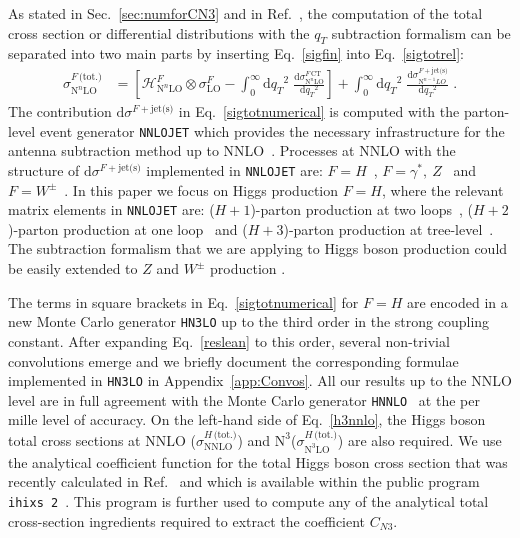 \documentclass[12pt]{article}
\DeclareRobustCommand{\qt}{\ensuremath{q_T}\xspace}
\DeclareRobustCommand{\rd}{\ensuremath{\mathrm{d}}}
\DeclareRobustCommand{\cH}{\ensuremath{\mathcal{H}}}
\DeclareRobustCommand{\jets}{\text{jet(s)}\xspace}
\DeclareRobustCommand{\CT}{\text{CT}\xspace}
\DeclareRobustCommand{\tot}{\text{(tot.)}\xspace}
\DeclareRobustCommand{\LO}{\text{LO}\xspace}
\DeclareRobustCommand{\NNLO}{\text{NNLO}\xspace}
\DeclareRobustCommand{\N}[1]{\ensuremath{\text{N}^{#1}}} %
\begin{document}
As stated in Sec.~\ref{sec:numforCN3} and in Ref.~\cite{Catani:2007vq}, the computation of the total cross section or differential distributions with the  $\qt$ subtraction formalism can be separated into two main parts by inserting Eq.~\eqref{sigfin} into Eq.~\eqref{sigtotrel}:
\begin{align}
  \sigma^{F\,\tot}_{\N{n}\LO}
  &=
  \left[
    \cH^F_{\N{n}\LO} \otimes \sigma^F_{\LO}
    - \int_0^\infty\rd\qt^2 \; \frac{\rd\sigma^{F\,\CT}_{\N{n}\LO}}{\rd\qt^2} 
  \right]
  + \int_0^\infty\rd\qt^2 \; \frac{\rd\sigma^{F+\jets}_{\N{n-1}LO}}{\rd\qt^2} \;.
  \label{sigtotnumerical} 
\end{align}
The contribution $\rd{\sigma}^{F+\jets}$ in Eq.~\eqref{sigtotnumerical} is computed with the parton-level event generator \texttt{NNLOJET} which provides the necessary infrastructure for the antenna subtraction method up to NNLO~\cite{Antenna:method}. 
Processes at NNLO with the structure of $\rd{\sigma}^{F+\jets}$ implemented in \texttt{NNLOJET} are: $F=H$~\cite{Chen:2016zka}, $F=\gamma^*,~Z$~\cite{Ridder:2015dxa,Gehrmann-DeRidder:2016jns} and $F=W^{\pm}$~\cite{Gehrmann-DeRidder:2017mvr}. In this paper we focus on Higgs production $F=H$, where the relevant matrix elements in 
 \texttt{NNLOJET} are: ($H+1$)-parton production at two loops~\cite{Gehrmann:2011aa}, ($H+2$)-parton production at one loop~\cite{Dixon:2009uk,Badger:2009hw,Badger:2009vh} and ($H+3$)-parton 
 production at tree-level~\cite{DelDuca:2004wt,Dixon:2004za,Badger:2004ty}. The subtraction formalism that we are applying to Higgs boson production could be easily extended  to $Z$ and $W^{\pm}$ production \cite{leaninprep}. 

The terms in square brackets in Eq.~\eqref{sigtotnumerical}  for $F=H$ are encoded in a new Monte Carlo generator \texttt{HN3LO} \cite{leaninprepHN3LO} up to the third order in the strong coupling constant. After expanding Eq.~\eqref{reslean} to this order, several non-trivial convolutions emerge and we briefly document the corresponding formulae implemented in \texttt{HN3LO} in Appendix~\ref{app:Convos}. All our results up to the NNLO level are in full agreement with the Monte Carlo generator \texttt{HNNLO}~\cite{Catani:2007vq} at the per mille level of accuracy. On the left-hand side of Eq.~\eqref{h3nnlo}, the Higgs boson total cross sections at NNLO ($\sigma^{H\,\tot}_{\NNLO}$) and \N3\LO  ($\sigma^{H\,\tot}_{\N{3}\LO}$) are also required. 
We use the analytical coefficient function for the total Higgs boson cross section that was recently calculated in Ref.~\cite{Mistlberger:2018etf} and which is available within the public program \texttt{ihixs 2}~\cite{Dulat:2018rbf}.
This program is further used to compute any of the analytical total cross-section ingredients required to extract the coefficient $C_{N3}$.
\end{document}
